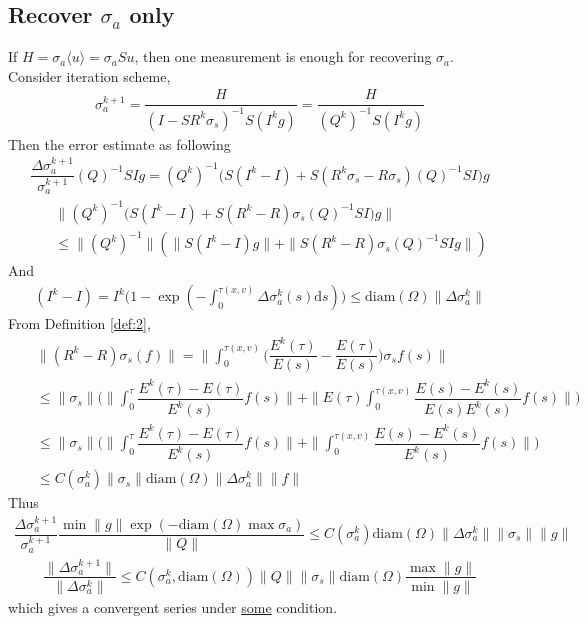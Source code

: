 \documentclass[12pt,a4paper]{article}
\newcommand{\avg}[1]{\langle#1\rangle}
\begin{document}
\subsection{Recover $\sigma_a$ only}
If $H = \sigma_a \avg{u} = \sigma_a Su$, then one measurement is enough for recovering $\sigma_a$. Consider iteration scheme,
\begin{eqnarray}
\sigma_a^{k+1} = \dfrac{H}{(I-SR^k\sigma_s)^{-1}S(I^kg)}= \dfrac{H}{(Q^k)^{-1}S(I^kg)}
\end{eqnarray}
Then the error estimate as following
\begin{eqnarray}
\dfrac{\Delta\sigma_a^{k+1}}{\sigma_a^{k+1}}(Q)^{-1}SIg =(Q^k)^{-1}\Big(S(I^k-I)+ S(R^k\sigma_s - R\sigma_s)(Q)^{-1}SI\Big)g
\end{eqnarray}
\begin{eqnarray}
&&\|(Q^k)^{-1}\Big(S(I^k-I)+ S(R^k - R)\sigma_s(Q)^{-1}SI\Big)g\|\nonumber\\
&&\le \|(Q^k)^{-1}\|(\|S(I^k - I)g\| + \|S(R^k - R)\sigma_s(Q)^{-1}SIg\|)
\end{eqnarray}
And
\begin{eqnarray}
(I^k - I) = I^k\Big(1 - \exp(-\int_0^{\tau(x,v)} \Delta \sigma_a^k(s)\mathrm{d}s)\Big)\le \mathrm{diam}(\Omega)\|\Delta \sigma_a^k\|
\end{eqnarray}
From Definition \ref{def:2},
\begin{eqnarray}
&&\|(R^k - R)\sigma_s(f)\| = \|\int_0^{\tau(x,v)}\Big(\dfrac{E^k(\tau)}{E(s)} - \dfrac{E(\tau)}{E(s)}\Big)\sigma_sf(s)\|\\
&&\le \|\sigma_s\|\Big(\|\int_{0}^{\tau} \dfrac{E^k(\tau)-E(\tau)}{E^k(s)}f(s)\| +
\|E(\tau)\int_0^{\tau(x,v)}\dfrac{E(s) - E^k(s)}{E(s)E^k(s)}f(s)\|\Big)\nonumber\\
&&\le \|\sigma_s\|\Big(\|\int_{0}^{\tau} \dfrac{E^k(\tau)-E(\tau)}{E^k(s)}f(s)\| +
\|\int_0^{\tau(x,v)}\dfrac{E(s) - E^k(s)}{E^k(s)}f(s)\|\Big)\\
&&\le C(\sigma_a^k)\|\sigma_s\| \mathrm{diam}(\Omega)\|\Delta\sigma_a^k\|\|f\|
\end{eqnarray}
Thus
\begin{eqnarray}
\dfrac{\Delta\sigma_a^{k+1}}{\sigma_a^{k+1}}\dfrac{\min \|g\|\exp(-\mathrm{diam}(\Omega)\max\sigma_a)}{\|Q\|}\le C(\sigma_a^k) \mathrm{diam}(\Omega)\|\Delta \sigma_a^k\|\|\sigma_s\|\|g\|
\end{eqnarray}
\begin{eqnarray}
\dfrac{\|\Delta \sigma_a^{k+1}\|}{\|\Delta \sigma_a^k\|} \le C(\sigma_a^k, \mathrm{diam}(\Omega))\|Q\|\|\sigma_s\|\mathrm{diam}(\Omega)\dfrac{\max\|g\|}{\min\|g\|}
\end{eqnarray}
which gives a convergent series under \underline{some} condition.
\end{document}

